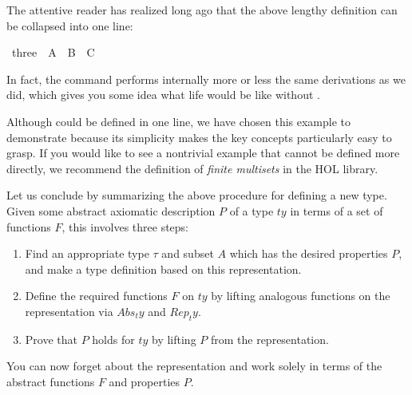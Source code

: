 \begin{isabellebody}
\begin{isamarkuptext}
The attentive reader has realized long ago that the
above lengthy definition can be collapsed into one line:%
\end{isamarkuptext}%
\ three{\isacharprime}\ {\isacharequal}\ A\ {\isacharbar}\ B\ {\isacharbar}\ C%
\begin{isamarkuptext}%
\noindent
In fact, the  command performs internally more or less
the same derivations as we did, which gives you some idea what life would be
like without .

Although  could be defined in one line, we have chosen this
example to demonstrate  because its simplicity makes the
key concepts particularly easy to grasp. If you would like to see a
nontrivial example that cannot be defined more directly, we recommend the
definition of \emph{finite multisets} in the HOL library.

Let us conclude by summarizing the above procedure for defining a new type.
Given some abstract axiomatic description $P$ of a type $ty$ in terms of a
set of functions $F$, this involves three steps:
\begin{enumerate}
\item Find an appropriate type $\tau$ and subset $A$ which has the desired
  properties $P$, and make a type definition based on this representation.
\item Define the required functions $F$ on $ty$ by lifting
analogous functions on the representation via $Abs_ty$ and $Rep_ty$.
\item Prove that $P$ holds for $ty$ by lifting $P$ from the representation.
\end{enumerate}
You can now forget about the representation and work solely in terms of the
abstract functions $F$ and properties $P$.%
\end{isamarkuptext}%
\end{isabellebody}%
